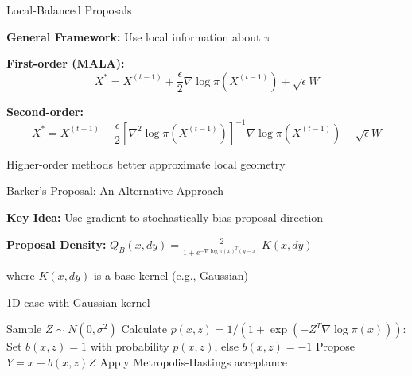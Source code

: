\documentclass[aspectratio=169]{beamer}
\begin{document}
\begin{frame}{Local-Balanced Proposals}

\textbf{General Framework:} Use local information about $\pi$

\vspace{0.5em}

\textbf{First-order (MALA):}
$$X^* = X^{(t-1)} + \frac{\epsilon}{2}\nabla\log\pi(X^{(t-1)}) + \sqrt{\epsilon}W$$

\textbf{Second-order:}
$$X^* = X^{(t-1)} + \frac{\epsilon}{2}[\nabla^2\log\pi(X^{(t-1)})]^{-1}\nabla\log\pi(X^{(t-1)}) + \sqrt{\epsilon}W$$

\vspace{0.5em}

\begin{center}
\end{center}

Higher-order methods better approximate local geometry
\end{frame}

\begin{frame}{Barker's Proposal: An Alternative Approach}

\textbf{Key Idea:} Use gradient to stochastically bias proposal direction

\vspace{0.5em}

\textbf{Proposal Density:} $Q_B(x, dy) = \frac{2}{1 + e^{-\nabla\log\pi(x)^T(y-x)}} K(x, dy)$

where $K(x, dy)$ is a base kernel (e.g., Gaussian)

\vspace{0.5em}



\begin{algorithm}[H]
\caption{1D case with Gaussian kernel}
\begin{algorithmic}
\STATE Sample $Z \sim N(0, \sigma^2)$
\STATE Calculate  $p(x, z) = 1/(1 + \exp(-Z^T\nabla\log\pi(x)))$:
\STATE Set $b(x,z) = 1$ with probability $p(x,z)$, else $b(x,z) = -1$
\STATE Propose $Y = x + b(x,z)Z$
\STATE Apply Metropolis-Hastings acceptance
\end{algorithmic}
\end{algorithm}

\end{frame}
\end{document}
